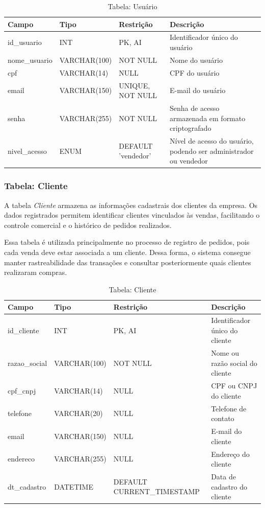\begin{table}[H]
\centering
\begin{tabular}{|p{3cm}|p{3cm}|p{3cm}|p{5cm}|}
\hline
\textbf{Campo} & \textbf{Tipo} & \textbf{Restrição} & \textbf{Descrição} \\ \hline
id\_usuario & INT & PK, AI & Identificador único do usuário \\ \hline
nome\_usuario & VARCHAR(100) & NOT NULL & Nome do usuário \\ \hline
cpf & VARCHAR(14) & NULL & CPF do usuário \\ \hline
email & VARCHAR(150) & UNIQUE, NOT NULL & E-mail do usuário \\ \hline
senha & VARCHAR(255) & NOT NULL & Senha de acesso armazenada em formato criptografado \\ \hline
nivel\_acesso & ENUM & DEFAULT 'vendedor' & Nível de acesso do usuário, podendo ser administrador ou vendedor \\ \hline
\end{tabular}
\caption{Tabela: Usuário}
\end{table}

\subsubsection{Tabela: Cliente}

A tabela \textit{Cliente} armazena as informações cadastrais dos clientes da empresa. Os dados registrados permitem identificar clientes vinculados às vendas, facilitando o controle comercial e o histórico de pedidos realizados.

Essa tabela é utilizada principalmente no processo de registro de pedidos, pois cada venda deve estar associada a um cliente. Dessa forma, o sistema consegue manter rastreabilidade das transações e consultar posteriormente quais clientes realizaram compras.

\begin{table}[H]
\centering
\begin{tabular}{|p{3cm}|p{3cm}|p{3cm}|p{5cm}|}
\hline
\textbf{Campo} & \textbf{Tipo} & \textbf{Restrição} & \textbf{Descrição} \\ \hline
id\_cliente & INT & PK, AI & Identificador único do cliente \\ \hline
razao\_social & VARCHAR(100) & NOT NULL & Nome ou razão social do cliente \\ \hline
cpf\_cnpj & VARCHAR(14) & NULL & CPF ou CNPJ do cliente \\ \hline
telefone & VARCHAR(20) & NULL & Telefone de contato \\ \hline
email & VARCHAR(150) & NULL & E-mail do cliente \\ \hline
endereco & VARCHAR(255) & NULL & Endereço do cliente \\ \hline
dt\_cadastro & DATETIME & DEFAULT CURRENT\_TIMESTAMP & Data de cadastro do cliente \\ \hline
\end{tabular}
\caption{Tabela: Cliente}
\end{table}

